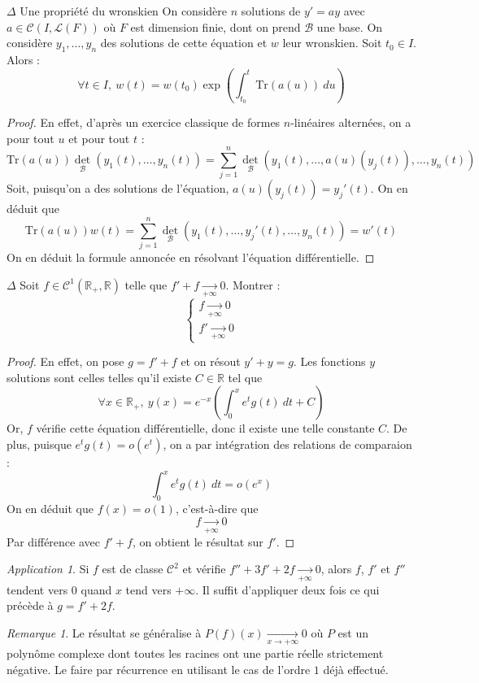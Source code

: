 \documentclass[french,a4paper]{article}
\newcommand{\R}{\mathbb{R}}
\newcommand{\Tr}{\text{Tr}}
\theoremstyle{plain}
\theoremstyle{definition}
\theoremstyle{remark}
\newtheorem*{rmq}{Remarque}
\newtheorem*{app}{Application}
\begin{document}
\begin{ex}[Moulin.ED.29]{$\Delta$ Une propriété du wronskien} On considère $n$ solutions de $y'=ay$ avec $a\in \mathcal{C}(I,\mathcal{L}(F))$ où $F$ est dimension finie, dont on prend $\mathcal{B}$ une base. On considère $y_1,\ldots, y_n$ des solutions de cette équation et $w$ leur wronskien. Soit $t_0\in I$. Alors : $$\forall t\in I,\ w(t)=w(t_0)\exp\left(\int_{t_0}^{t}\Tr(a(u))\ du\right)$$
\end{ex}
\begin{proof}
	En effet, d'après un exercice classique de formes $n$-linéaires alternées, on a pour tout $u$ et pour tout $t$ : $$\Tr(a(u))\det_\mathcal{B}(y_1(t),\ldots,y_n(t))=\sum_{j=1}^{n}\det_\mathcal{B}(y_1(t),\ldots,a(u)(y_j(t)),\ldots,y_n(t))$$ Soit, puisqu'on a des solutions de l'équation, $a(u)(y_j(t))=y_j'(t)$. On en déduit que $$\Tr(a(u))w(t)=\sum_{j=1}^{n}\det_\mathcal{B}(y_1(t),\ldots,y_j'(t),\ldots,y_n(t))=w'(t)$$ On en déduit la formule annoncée en résolvant l'équation différentielle.
\end{proof}

\begin{ex}[Moulin.ED.30]{$\Delta$}
	Soit $f\in\mathcal{C}^1(\R_+,\R)$ telle que $f'+f\xrightarrow[+\infty]{}0$. Montrer : $$\begin{cases}
		f\xrightarrow[+\infty]{}0 \\
		f'\xrightarrow[+\infty]{}0
	\end{cases}$$
\end{ex}
\begin{proof}
	En effet, on pose $g=f'+f$ et on résout $y'+y=g$. Les fonctions $y$ solutions sont celles telles qu'il existe $C\in\R$ tel que $$\forall x\in\R_+,\ y(x)=e^{-x}\left(\int_{0}^{x}e^{t}g(t)\ dt +C\right)$$ Or, $f$ vérifie cette équation différentielle, donc il existe une telle constante $C$. De plus, puisque $e^{t}g(t)=o(e^{t})$, on a par intégration des relations de comparaion : $$\int_{0}^{x}e^{t}g(t)\ dt=o(e^x)$$ On en déduit que $f(x)=o(1)$, c'est-à-dire que $$f\xrightarrow[+\infty]{}0$$ Par différence avec $f'+f$, on obtient le résultat sur $f'$.
\end{proof}
\begin{app}
	Si $f$ est de classe $\mathcal{C}^2$ et vérifie $f''+3f'+2f\xrightarrow[+\infty]{}0$, alors $f$, $f'$ et $f''$ tendent vers $0$ quand $x$ tend vers $+\infty$. Il suffit d'appliquer deux fois ce qui précède à $g=f'+2f$.
\end{app}
\begin{rmq}
	Le résultat se généralise à $P(f)(x)\xrightarrow[x\to+\infty]{}0$ où $P$ est un polynôme complexe dont toutes les racines ont une partie réelle strictement négative. Le faire par récurrence en utilisant le cas de l'ordre $1$ déjà effectué.
\end{rmq}
\end{document}
